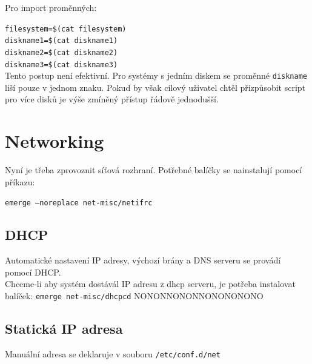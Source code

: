 \documentclass[12pt,a4paper,twoside,]{article}
\begin{document}
\hspace*{-1.5em}Pro import proměnných:

\texttt{filesystem=\$(cat filesystem)}\\
\hspace*{1.5em}\texttt{diskname1=\$(cat diskname1)}\\
\hspace*{1.5em}\texttt{diskname2=\$(cat diskname2)}\\
\hspace*{1.5em}\texttt{diskname3=\$(cat diskname3)}\\

\hspace*{-1.5em}Tento postup není efektivní. Pro systémy s jedním diskem se proměnné \texttt{diskname} liší pouze v jednom znaku. Pokud by však cílový uživatel chtěl přizpůsobit script pro více disků je výše zmíněný přístup řádově jednodušší.

\newpage

\section{Networking}

Nyní je třeba zprovoznit síťová rozhraní. Potřebné balíčky se nainstalují pomocí příkazu:

\texttt{emerge --noreplace net-misc/netifrc}\\


\subsection{DHCP}
Automatické nastavení IP adresy, výchozí brány a DNS serveru se provádí pomocí DHCP.\\ 
Chceme-li aby systém dostávál IP adresu z dhcp serveru, je potřeba instalovat balíček: 
\hspace*{1.5em}\texttt{emerge net-misc/dhcpcd}
NONONNONONNONONONONO

\subsection{Statická IP adresa}
Manuální adresa se deklaruje v souboru \texttt{/etc/conf.d/net} 
\end{document}
